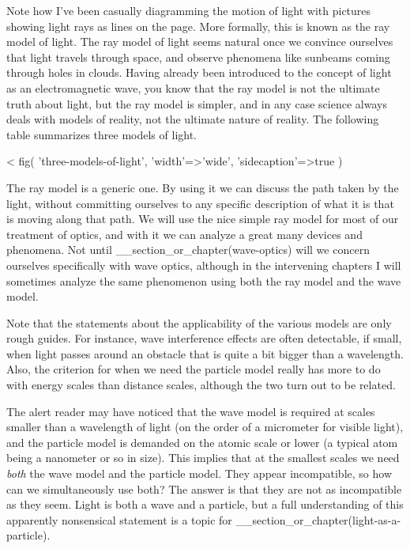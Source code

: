 Note how I've been casually diagramming the motion of light
with pictures showing light rays as lines on the page. More
formally, this is known as the ray model of light. The ray
model of light seems natural once we convince ourselves that
light travels through space, and observe phenomena like
sunbeams coming through holes in clouds. Having already been
introduced to the concept of light as an electromagnetic
wave, you know that the ray model is not the ultimate truth
about light, but the ray model is simpler, and in any case
science always deals with models of reality, not the
ultimate nature of reality. The following table summarizes
three models of light.

<%
  fig(
    'three-models-of-light',
    {
      'width'=>'wide',
      'sidecaption'=>true
    }
  )

The ray model is a generic one. By using it we
can discuss the path taken by the light, without committing
ourselves to any specific description of what it is that is
moving along that path. We will use the nice simple ray
model for most of our treatment of optics, and with it we can analyze a
great many devices and phenomena. Not until __section_or_chapter(wave-optics)
will we concern ourselves specifically with wave optics,
although in the intervening chapters I will sometimes
analyze the same phenomenon using both the ray model and the wave model.

Note that the statements about the applicability of the
various models are only rough guides. For instance, wave
interference effects are often detectable, if small, when
light passes around an obstacle that is quite a bit bigger
than a wavelength. Also, the criterion for when we need the
particle model really has more to do with energy scales than
distance scales, although the two turn out to be related.

The alert reader may have noticed that the wave model is
required at scales smaller than a wavelength of light (on
the order of a micrometer for visible light), and the
particle model is demanded on the atomic scale or lower (a
typical atom being a nanometer or so in size). This implies
that at the smallest scales we need \emph{both} the wave
model and the particle model. They appear incompatible, so
how can we simultaneously use both? The answer is that they
are not as incompatible as they seem. Light is both a wave
and a particle, but a full understanding of this apparently
nonsensical statement is a topic for __section_or_chapter(light-as-a-particle).


